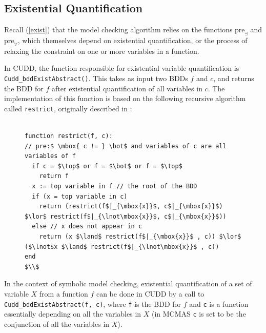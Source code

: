 \documentclass[11pt]{report}
\begin{document}
\subsection{Existential Quantification}
\label{exist_implementation}

Recall  (\ref{exist}) that the model checking algorithm relies on the functions $\mbox{pre}_\exists$ and $\mbox{pre}_\forall$, which themselves depend on existential quantification, or the process of relaxing the constraint on one or more variables in a function. 

In CUDD, the function responsible for existential variable quantification is \texttt{Cudd\_bddExistAbstract()}. This takes as input two BDDs $f$ and $c$, and returns the BDD for $f$ after existential quantification of all variables in $c$. The implementation of this function is based on the following recursive algorithm called \texttt{restrict}, originally described in \cite{unified_framework}: 
\begin{figure}

\begin{lstlisting}[mathescape]

function restrict(f, c):
// pre:$ \mbox{ c != } \bot$ and variables of c are all variables of f
  if c = $\top$ or f = $\bot$ or f = $\top$
    return f
  x := top variable in f // the root of the BDD
  if (x = top variable in c)  
    return (restrict(f$|_{\mbox{x}}$, c$|_{\mbox{x}}$) $\lor$ restrict(f$|_{\lnot\mbox{x}}$, c$|_{\mbox{x}}$))
  else // x does not appear in c
    return (x $\land$ restrict(f$|_{\mbox{x}}$ , c)) $\lor$ ($\lnot$x $\land$ restrict(f$|_{\lnot\mbox{x}}$ , c))
end
$\\$
\end{lstlisting}
\end{figure}


In the context of symbolic model checking, existential quantification of a set of variable $X$ from a function $f$ can be done in CUDD by a call to \texttt{Cudd\_bddExistAbstract(f, c)}, where \texttt{f} is the BDD for $f$ and \texttt{c} is a function essentially depending on all the variables in $X$ (in MCMAS \texttt{c} is set to be the conjunction of all the variables in $X$).
\end{document}
